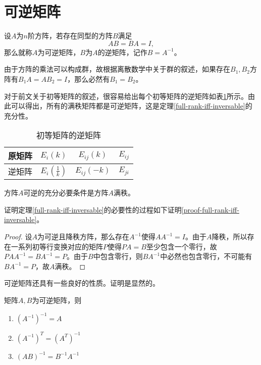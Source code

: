 \section{可逆矩阵} %

\begin{definition}
    \label{inversable-matrix}
    设$A$为$n$阶方阵，若存在同型的方阵$B$满足
    \[ AB=BA=I, \]
    那么就称$A$为可逆矩阵，$B$为$A$的逆矩阵，记作$B=A^{-1}$。
\end{definition}

由于方阵的乘法可以构成群，故根据离散数学中关于群的叙述，如果存在$B_1,B_2$方阵有$B_1A=AB_2=I$，那么必然有$B_1=B_2$。

对于前文关于初等矩阵的叙述，很容易给出每个初等矩阵的逆矩阵如表\ref{inverse-elementory}所示。由此可以得出，所有的满秩矩阵都是可逆矩阵，这是定理\ref{full-rank-iff-inversable}的充分性。

\begin{table}[!hbt]
    \centering
    \begin{tabular}{cccc}
        \toprule
        原矩阵 & $E_i(k)$ & $E_{ij}(k)$ & $E_{ij}$ \\
        \midrule
        逆矩阵 & $E_i\left(\frac1k\right)$ & $E_{ij}(-k)$ & $E_{ji}$ \\
        \bottomrule
    \end{tabular}
    \caption{初等矩阵的逆矩阵}
    \label{inverse-elementory}
\end{table}

\begin{thm}
    \label{full-rank-iff-inversable}
    方阵$A$可逆的充分必要条件是方阵$A$满秩。
\end{thm}

证明定理\ref{full-rank-iff-inversable}的必要性的过程如下证明\ref{proof-full-rank-iff-inversable}。

\begin{proof}
    \label{proof-full-rank-iff-inversable}
    设$A$为可逆且降秩方阵，那么存在$A^{-1}$使得$AA^{-1}=I$。由于$A$降秩，所以存在一系列初等行变换对应的矩阵$P$使得$PA=B$至少包含一个零行，故$PAA^{-1}=BA^{-1}=P$。由于$B$中包含零行，则$BA^{-1}$中必然也包含零行，不可能有$BA^{-1}=P$，故$A$满秩。
\end{proof}

可逆矩阵还具有一些良好的性质。证明是显然的。

\begin{property}
    \label{property-of-inversable-matrix}
    矩阵$A,B$为可逆矩阵，则
    \begin{enumerate}
        \item $(A^{-1})^{-1}=A$
        \item $(A^{-1})^T=(A^T)^{-1}$
        \item $(AB)^{-1}=B^{-1}A^{-1}$
    \end{enumerate}
\end{property}

